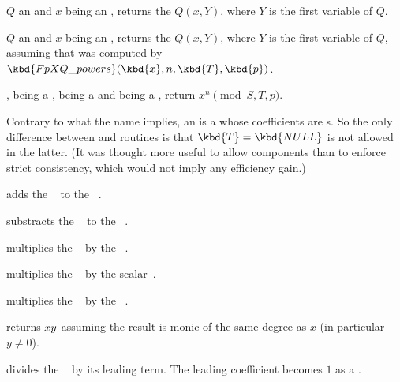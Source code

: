  $Q$ an  and
$x$ being an , returns the  $Q(x,Y)$, where $Y$ is the
first variable of $Q$.

 $Q$ an  and
$x$ being an , returns the  $Q(x,Y)$, where $Y$ is the
first variable of $Q$, assuming that  was computed by
$\kbd{FpXQ\_powers}(\kbd{x}, n, \kbd{T}, \kbd{p})$.

,  being a
,  being a  and  being a ,
return $x^n \pmod{S,T,p}$.

Contrary to what the name implies, an  is a  whose
coefficients are s. So the only difference between  and
 routines is that $\kbd{T} = \kbd{NULL}$ is not allowed in the
latter. (It was thought more useful to allow  components than to
enforce strict consistency, which would not imply any efficiency gain.)



 adds the
~ to the ~.

 substracts the
~ to the ~.




 multiplies the
~ by the ~.

 multiplies the
~ by the scalar~.

 multiplies the
~ by the ~.

returns $x\*y$ assuming the result is monic of the same degree as $x$ (in
particular $y\neq 0$).


 divides the ~
by its leading term. The leading coefficient becomes $1$ as a .

